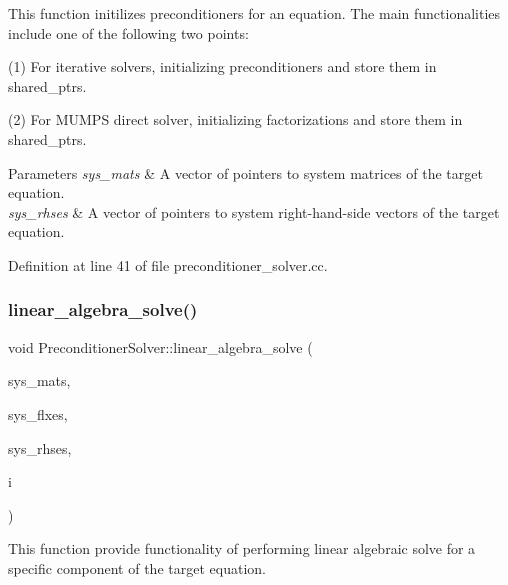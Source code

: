 This function initilizes preconditioners for an equation. The main functionalities include one of the following two points\+:

(1) For iterative solvers, initializing preconditioners and store them in shared\+\_\+ptr\textquotesingle{}s.

(2) For M\+U\+M\+PS direct solver, initializing factorizations and store them in shared\+\_\+ptr\textquotesingle{}s.


\begin{DoxyParams}{Parameters}
{\em sys\+\_\+mats} & A vector of pointers to system matrices of the target equation. \\
\hline
{\em sys\+\_\+rhses} & A vector of pointers to system right-\/hand-\/side vectors of the target equation. \\
\hline
\end{DoxyParams}


Definition at line 41 of file preconditioner\+\_\+solver.\+cc.

\mbox{\label{class_preconditioner_solver_a5adc9e36ec12ed148eef7f1120c1bc4e}} 
\subsubsection{\texorpdfstring{linear\+\_\+algebra\+\_\+solve()}{linear\_algebra\_solve()}}
{\footnotesize\ttfamily void Preconditioner\+Solver\+::linear\+\_\+algebra\+\_\+solve (\begin{DoxyParamCaption}\item[{std\+::vector$<$ P\+E\+T\+Sc\+Wrappers\+::\+M\+P\+I\+::\+Sparse\+Matrix $\ast$$>$ \&}]{sys\+\_\+mats,  }\item[{std\+::vector$<$ P\+E\+T\+Sc\+Wrappers\+::\+M\+P\+I\+::\+Vector $\ast$$>$ \&}]{sys\+\_\+flxes,  }\item[{std\+::vector$<$ P\+E\+T\+Sc\+Wrappers\+::\+M\+P\+I\+::\+Vector $\ast$$>$ \&}]{sys\+\_\+rhses,  }\item[{unsigned int \&}]{i }\end{DoxyParamCaption})}

This function provide functionality of performing linear algebraic solve for a specific component of the target equation.



